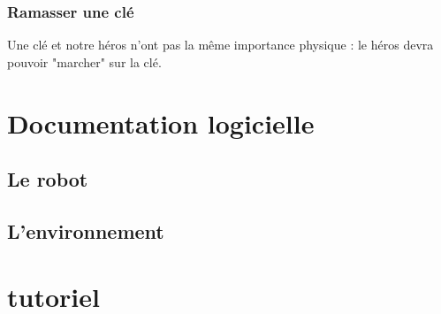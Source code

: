 \documentclass[a4paper 12pts]{article}
\begin{document}

\subsubsection {Ramasser une clé}
Une clé et notre héros n'ont pas la même importance physique : le héros devra pouvoir "marcher" sur la clé.

 

\section{Documentation logicielle}



\subsection{Le robot}
\subsection{L'environnement}



\section{tutoriel}
\end{document}
